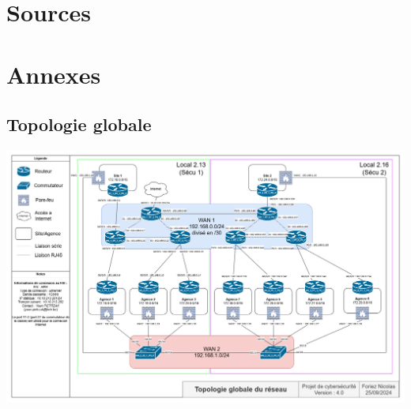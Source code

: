\documentclass[a4paper,12pt]{article}
\begin{document}
\section{Sources}
\section{Annexes}
\subsection{Topologie globale}
\includegraphics[width=1\textwidth]{topo_globale.png}
\end{document}
